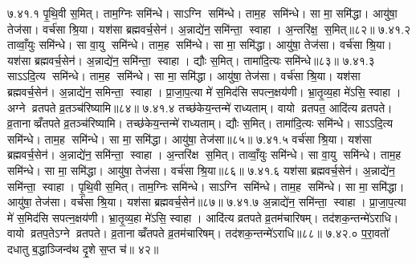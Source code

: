 ७.४१.१
पृ॒थि॒वी स॒मित्। ताम॒ग्निः समि॑न्धे। साऽग्नि समि॑न्धे। ताम॒ह समि॑न्धे। सा मा॒ समि॑द्धा। आयु॑षा॒ तेज॑सा। वर्च॑सा श्रि॒या। यश॑सा ब्रह्मवर्च॒सेन॑। अ॒न्नाद्ये॑न॒ समि॑न्ता॒ स्वाहा। अ॒न्तरि॑क्ष॒ स॒मित्॥८२॥
७.४१.२
ताव्वाँ॒युः समि॑न्धे। सा वा॒यु समि॑न्धे। ताम॒ह समि॑न्धे। सा मा॒ समि॑द्धा। आयु॑षा॒ तेज॑सा। वर्च॑सा श्रि॒या। यश॑सा ब्रह्मवर्च॒सेन॑। अ॒न्नाद्ये॑न॒ समि॑न्ता॒ स्वाहा। द्यौः स॒मित्। तामा॑दि॒त्यः समि॑न्धे॥८३॥
७.४१.३
साऽऽदि॒त्य समि॑न्धे। ताम॒ह समि॑न्धे। सा मा॒ समि॑द्धा। आयु॑षा॒ तेज॑सा। वर्च॑सा श्रि॒या। यश॑सा ब्रह्मवर्च॒सेन॑। अ॒न्नाद्ये॑न॒ समिन्ता॒ स्वाहा। प्रा॒जा॒प॒त्या मे॑ स॒मिद॑सि सपत्न॒क्षय॑णी। भ्रा॒तृ॒व्य॒हा मे॑ऽसि॒ स्वाहा। अग्ने व्रतपते व्र॒तञ्च॑रिष्यामि॥८४॥
७.४१.४
तच्छ॑केय॒न्तन्मे॑ राध्यताम्। वायो व्रतपत॒ आदि॑त्य व्रतपते। व्र॒तानाव्व्रँतपते व्र॒तञ्च॑रिष्यामि। तच्छ॑केय॒न्तन्मे॑ राध्यताम्। द्यौः स॒मित्। तामा॑दि॒त्यः समि॑न्धे। साऽऽदि॒त्य समि॑न्धे। ताम॒ह समि॑न्धे। सा मा॒ समि॑द्धा। आयु॑षा॒ तेज॑सा॥८५॥
७.४१.५
वर्च॑सा श्रि॒या। यश॑सा ब्रह्मवर्च॒सेन॑। अ॒न्नाद्ये॑न॒ समि॑न्ता॒ स्वाहा। अ॒न्तरि॑क्ष स॒मित्। ताव्वाँ॒युः समि॑न्धे। सा वा॒यु समि॑न्धे। ताम॒ह समि॑न्धे। सा मा॒ समि॑द्धा। आयु॑षा॒ तेज॑सा। वर्च॑सा श्रि॒या॥८६॥
७.४१.६
यश॑सा ब्रह्मवर्च॒सेन॑। अ॒न्नाद्ये॑न॒ समि॑न्ता॒ स्वाहा। पृ॒थि॒वी स॒मित्। ताम॒ग्निः समि॑न्धे। साऽग्नि समि॑न्धे। ताम॒ह समि॑न्धे। सा मा॒ समि॑द्धा। आयु॑षा॒ तेज॑सा। वर्च॑सा श्रि॒या। यश॑सा ब्रह्मवर्च॒सेन॑॥८७॥
७.४१.७
अ॒न्नाद्ये॑न॒ समि॑न्ता॒ स्वाहा। प्रा॒जा॒प॒त्या मे॑ स॒मिद॑सि सपत्न॒क्षय॑णी। भ्रा॒तृ॒व्य॒हा मे॑ऽसि॒ स्वाहा। आदि॑त्य व्रतपते व्र॒तम॑चारिषम्। तद॑शक॒न्तन्मे॑ऽराधि। वायो व्रतप॒तेऽग्ने व्रतपते। व्र॒तानाव्व्रँतपते व्र॒तम॑चारिषम्। तद॑शक॒न्तन्मे॑ऽराधि॥८८॥
७.४२.०
प॒रा॒वतो॑ दधातु ब॒द्धाञ्जिन्व॑थ दृ॒शे स॒प्त च॑॥ ४२॥
\anuvakamend

